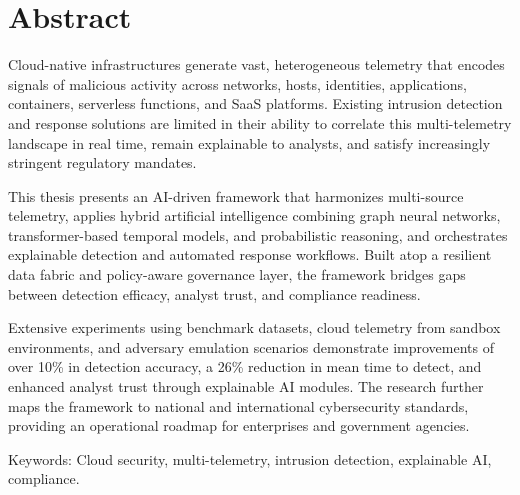 \chapter*{Abstract}
Cloud-native infrastructures generate vast, heterogeneous telemetry that encodes signals of malicious activity across networks, hosts, identities, applications, containers, serverless functions, and SaaS platforms. Existing intrusion detection and response solutions are limited in their ability to correlate this multi-telemetry landscape in real time, remain explainable to analysts, and satisfy increasingly stringent regulatory mandates.

This thesis presents an AI-driven framework that harmonizes multi-source telemetry, applies hybrid artificial intelligence combining graph neural networks, transformer-based temporal models, and probabilistic reasoning, and orchestrates explainable detection and automated response workflows. Built atop a resilient data fabric and policy-aware governance layer, the framework bridges gaps between detection efficacy, analyst trust, and compliance readiness.

Extensive experiments using benchmark datasets, cloud telemetry from sandbox environments, and adversary emulation scenarios demonstrate improvements of over 10\% in detection accuracy, a 26\% reduction in mean time to detect, and enhanced analyst trust through explainable AI modules. The research further maps the framework to national and international cybersecurity standards, providing an operational roadmap for enterprises and government agencies.

Keywords: Cloud security, multi-telemetry, intrusion detection, explainable AI, compliance.

\cleardoublepage
